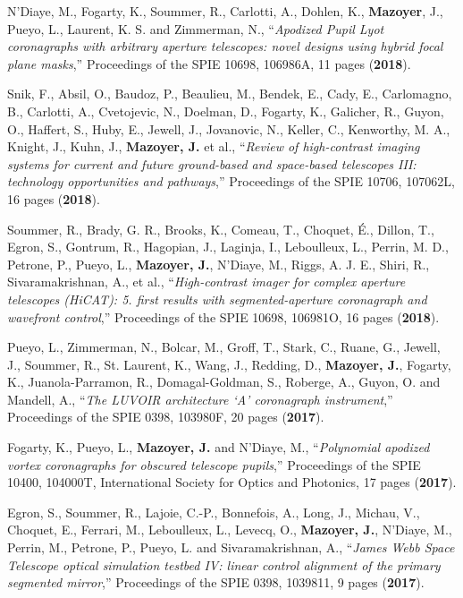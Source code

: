 \documentclass[11pt,a4paper, french]{article}
\begin{document}
\begin{etaremune}
\item N’Diaye, M., Fogarty, K., Soummer, R., Carlotti, A., Dohlen, K., \textbf{Mazoyer}, J., Pueyo, L., Laurent, K. S. and Zimmerman, N., “\textit{Apodized Pupil Lyot coronagraphs with arbitrary aperture telescopes: novel designs using hybrid focal plane masks},” Proceedings of the SPIE 10698, 106986A, 11 pages (\textbf{2018}).
\item Snik, F., Absil, O., Baudoz, P., Beaulieu, M., Bendek, E., Cady, E., Carlomagno, B., Carlotti, A., Cvetojevic, N., Doelman, D., Fogarty, K., Galicher, R., Guyon, O., Haffert, S., Huby, E., Jewell, J., Jovanovic, N., Keller, C., Kenworthy, M. A.,  Knight, J., Kuhn, J., \textbf{Mazoyer, J.} et al., “\textit{Review of high-contrast imaging systems for current and future ground-based and space-based telescopes III: technology opportunities and pathways},” Proceedings of the SPIE 10706, 107062L, 16 pages (\textbf{2018}).
\item Soummer, R., Brady, G. R., Brooks, K., Comeau, T., Choquet, É., Dillon, T., Egron, S., Gontrum, R., Hagopian, J., Laginja, I., Leboulleux, L., Perrin, M. D., Petrone, P., Pueyo, L., \textbf{Mazoyer, J.}, N’Diaye, M., Riggs, A. J. E., Shiri, R., Sivaramakrishnan, A., et al., “\textit{High-contrast imager for complex aperture telescopes (HiCAT): 5. first results with segmented-aperture coronagraph and wavefront control},” Proceedings of the SPIE 10698, 106981O, 16 pages (\textbf{2018}).
\item Pueyo, L., Zimmerman, N., Bolcar, M., Groff, T., Stark, C., Ruane, G., Jewell, J., Soummer, R., St. Laurent, K., Wang, J., Redding, D., \textbf{Mazoyer, J.}, Fogarty, K., Juanola-Parramon, R., Domagal-Goldman, S., Roberge, A., Guyon, O. and Mandell, A., “\textit{The LUVOIR architecture ‘A’ coronagraph instrument},” Proceedings of the SPIE 0398, 103980F, 20 pages (\textbf{2017}).
\item Fogarty, K., Pueyo, L., \textbf{Mazoyer, J.} and N’Diaye, M., “\textit{Polynomial apodized vortex coronagraphs for obscured telescope pupils},” Proceedings of the SPIE 10400, 104000T, International Society for Optics and Photonics, 17 pages (\textbf{2017}).
\item Egron, S., Soummer, R., Lajoie, C.-P., Bonnefois, A., Long, J., Michau, V., Choquet, E., Ferrari, M., Leboulleux, L., Levecq, O., \textbf{Mazoyer, J.}, N’Diaye, M., Perrin, M., Petrone, P., Pueyo, L. and Sivaramakrishnan, A., “\textit{James Webb Space Telescope optical simulation testbed IV: linear control alignment of the primary segmented mirror},” Proceedings of the SPIE 0398, 1039811, 9 pages (\textbf{2017}).

\end{etaremune}
\end{document}
